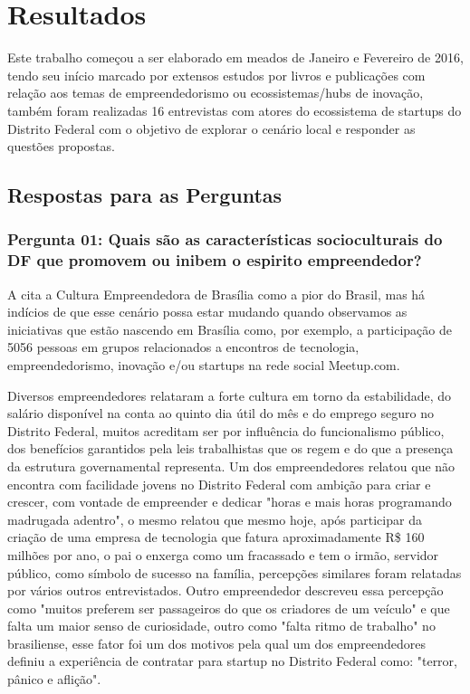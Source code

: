 \chapter[Resultados]{Resultados}
\label{cap-resultados}

Este trabalho começou a ser elaborado em meados de Janeiro e Fevereiro de 2016, tendo seu início marcado por extensos estudos por livros e publicações com relação aos temas de empreendedorismo ou ecossistemas/hubs de inovação, também foram realizadas 16 entrevistas com atores do ecossistema de startups do Distrito Federal com o objetivo de explorar o cenário local e responder as questões propostas.

\section{Respostas para as Perguntas}
\label{section:perguntas_de_pesquisa}

\subsection*{Pergunta 01: Quais são as características socioculturais do DF que promovem ou inibem o espirito empreendedor?}
\label{subsection:pergunta_de_pesquisa_1}

A  cita a Cultura Empreendedora de Brasília como a pior do Brasil, mas há indícios de que esse cenário possa estar mudando quando observamos as iniciativas que estão nascendo em Brasília como, por exemplo, a participação de 5056 pessoas em grupos relacionados a encontros de tecnologia, empreendedorismo, inovação e/ou startups na rede social Meetup.com.

Diversos empreendedores relataram a forte cultura em torno da estabilidade, do salário disponível na conta ao quinto dia útil do mês e do emprego seguro no Distrito Federal, muitos acreditam ser por influência do funcionalismo público, dos benefícios garantidos pela leis trabalhistas que os regem e do que a presença da estrutura governamental representa. Um dos empreendedores relatou que não encontra com facilidade jovens no Distrito Federal com ambição para criar e crescer, com vontade de empreender e dedicar "horas e mais horas programando madrugada adentro", o mesmo relatou que mesmo hoje, após participar da criação de uma empresa de tecnologia que fatura aproximadamente R\$ 160 milhões por ano, o pai o enxerga como um fracassado e tem o irmão, servidor público, como símbolo de sucesso na família, percepções similares foram relatadas por vários outros entrevistados. Outro empreendedor descreveu essa percepção como "muitos preferem ser passageiros do que os criadores de um veículo" e que falta um maior senso de curiosidade, outro como "falta ritmo de trabalho" no brasiliense, esse fator foi um dos motivos pela qual um dos empreendedores definiu a experiência de contratar para startup no Distrito Federal como: "terror, pânico e aflição". 

